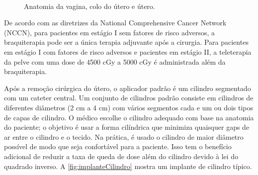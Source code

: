 \documentclass[11pt,a4paper]{article}
\begin{document}
	\begin{figure}[h]
		\centering
		 \\ %
		\caption{Anatomia da vagina, colo do útero e útero.}
		\label{fig:AnatomiaGineco}
	\end{figure}

	De acordo com as diretrizes da National Comprehensive Cancer Network (NCCN), para pacientes em estágio I sem fatores de risco adversos, a braquiterapia pode ser a única terapia adjuvante após a cirurgia. Para pacientes em estágio I com fatores de risco adversos e pacientes em estágio II, a teleterapia da pelve com uma dose de 4500 cGy a 5000 cGy é administrada além da braquiterapia.

	Após a remoção cirúrgica do útero, o aplicador padrão é um cilindro segmentado com um cateter central. Um conjunto de cilindros padrão consiste em cilindros de diferentes diâmetros (2 cm a 4 cm) com vários segmentos cada e um ou dois tipos de capas de cilindro. O médico escolhe o cilindro adequado com base na anatomia do paciente; o objetivo é usar a forma cilíndrica que minimiza quaisquer gaps de ar entre o cilindro e o tecido. Na prática, é usado o cilindro de maior diâmetro possível de modo que seja confortável para a paciente. Isso tem o benefício adicional de reduzir a taxa de queda de dose além do cilindro devido à lei do quadrado inverso. A \ref{fig:implanteCilindro} mostra um implante de cilindro típico.
\end{document}
